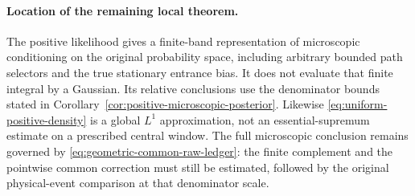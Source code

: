 \paragraph{Location of the remaining local theorem.}
The positive likelihood gives a finite-band representation of microscopic
conditioning on the original probability space, including arbitrary
bounded path selectors and the true stationary entrance bias.
It does not evaluate that finite integral by a Gaussian. Its relative
conclusions use the denominator bounds stated in
Corollary~\ref{cor:positive-microscopic-posterior}. Likewise
\eqref{eq:uniform-positive-density} is a global $L^1$ approximation,
not an essential-supremum estimate on a prescribed central window.
The full microscopic conclusion remains governed by
\eqref{eq:geometric-common-raw-ledger}: the finite complement and the
pointwise common correction must still be estimated, followed by the
original physical-event comparison at that denominator scale.
